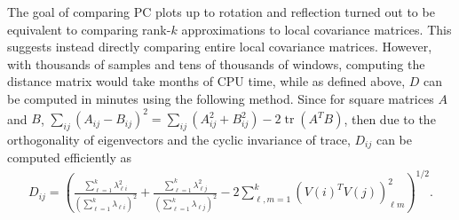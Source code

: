 \documentclass[11pt, oneside]{article}   	%
\DeclareMathOperator{\tr}{tr}
\begin{document}
The goal of comparing PC plots up to rotation and reflection 
turned out to be equivalent to comparing rank-$k$ approximations to local covariance matrices.
This suggests instead directly comparing entire local covariance matrices. 
However, with thousands of samples and tens of thousands of windows,
computing the distance matrix would take months of CPU time,
while as defined above, $D$ can be computed in minutes using the following method.
Since for square matrices $A$ and $B$,
$\sum_{ij} (A_{ij}-B_{ij})^2 = \sum_{ij} (A^2_{ij} + B^2_{ij}) - 2 \tr(A^T B)$,
then due to the orthogonality of eigenvectors and the cyclic invariance of trace,
$D_{ij}$ can be computed efficiently as
\begin{align}
    D_{ij} 
    = 
    \left(
    \frac{ \sum_{\ell=1}^k \lambda_{\ell i}^2 }{ (\sum_{\ell=1}^k \lambda_{\ell i})^2 }
    + \frac{ \sum_{\ell=1}^k \lambda_{\ell j}^2 }{ (\sum_{\ell=1}^k \lambda_{\ell j})^2 }
    - 2 \sum_{\ell, m=1}^k (V(i)^T V(j))^2_{\ell m} 
    \right)^{1/2}.
\end{align}
\end{document}
